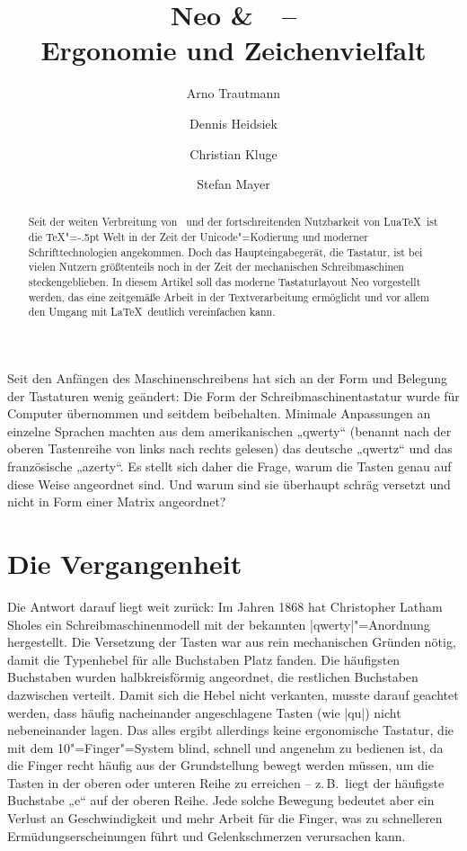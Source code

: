 \documentclass[ngerman]{dtk}
\title{Neo \&\ \XeLaTeX\ –\\ Ergonomie und Zeichenvielfalt}
\author{Arno Trautmann\and Dennis Heidsiek\and Christian Kluge\and Stefan Mayer}
\newcommand\LuaTeX{Lua\TeX}
\begin{document}
\maketitle
\begin{abstract}
Seit der weiten Verbreitung von \XeTeX\ und der fortschreitenden Nutzbarkeit von \LuaTeX\ ist die  \TeX"=\kern-.5pt Welt in der Zeit der Unicode"=Kodierung und moderner Schrifttechnologien angekommen. Doch das Haupteingabegerät, die Tastatur, ist bei vielen Nutzern größtenteils noch in der Zeit der mechanischen Schreibmaschinen steckengeblieben. In diesem Artikel soll das moderne Tastaturlayout Neo vorgestellt werden, das eine zeitgemäße Arbeit in der Textverarbeitung ermöglicht und vor allem den Umgang mit \LaTeX\ deutlich vereinfachen kann.
\end{abstract}
Seit den Anfängen des Maschinenschreibens hat sich an der Form und Belegung der Tastaturen wenig geändert: Die Form der Schreibmaschinentastatur wurde für Computer übernommen und seitdem beibehalten. Minimale Anpassungen an einzelne Sprachen machten aus dem amerikanischen „\hbox{qwerty}“ (benannt nach der oberen Tastenreihe von links nach rechts gelesen) das deutsche „qwertz“ und das französische „azerty“. Es stellt sich daher die Frage, warum die Tasten genau auf diese Weise angeordnet sind. Und warum sind sie überhaupt schräg versetzt und nicht in Form einer Matrix angeordnet?

\section{Die Vergangenheit}
Die Antwort darauf liegt weit zurück: Im Jahren 1868 hat Christopher Latham Sholes ein Schreibmaschinenmodell mit der bekannten |qwerty|"=Anordnung hergestellt.\cite{patentqwerty} Die Versetzung der Tasten war aus rein mechanischen Gründen nötig, damit die Typenhebel für alle Buchstaben Platz fanden. Die häufigsten Buchstaben wurden halbkreisförmig angeordnet, die restlichen Buchstaben dazwischen verteilt. Damit sich die Hebel nicht verkanten, musste darauf geachtet werden, dass häufig nacheinander angeschlagene Tasten (wie |qu|) nicht nebeneinander lagen. Das alles ergibt allerdings keine ergonomische Tastatur, die mit dem 10"=Finger"=System blind, schnell und angenehm zu bedienen ist, da die Finger recht häufig aus der Grundstellung bewegt werden müssen, um die Tasten in der oberen oder unteren Reihe zu erreichen – z.\,B.\ liegt der häufigste Buchstabe „e“ auf der oberen Reihe. Jede solche Bewegung bedeutet aber ein Verlust an Geschwindigkeit und mehr Arbeit für die Finger, was zu schnelleren Ermüdungserscheinungen führt und Gelenkschmerzen verursachen kann.
\end{document}
